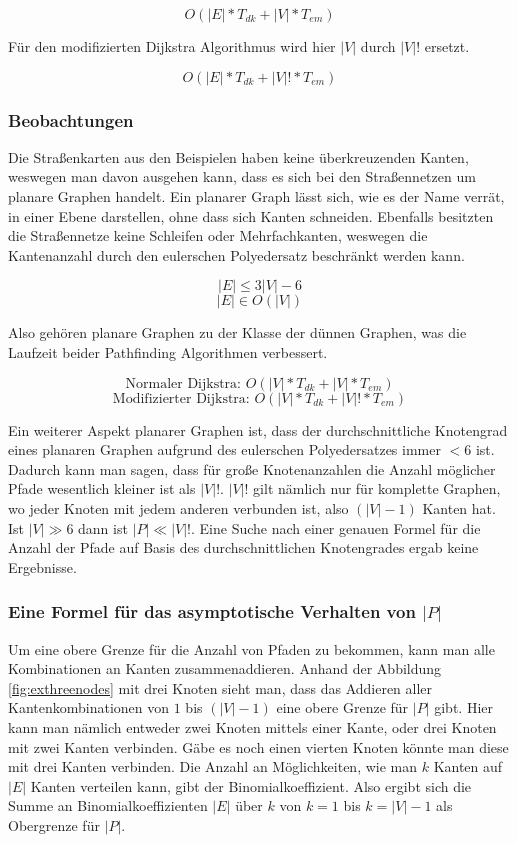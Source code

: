 \documentclass[a4paper,10pt,ngerman]{scrartcl}
\begin{document}
$$
O(|E| * T_{dk} + |V| * T_{em})
$$

Für den modifizierten Dijkstra Algorithmus wird hier $|V|$ durch $|V|!$ ersetzt.

$$
O(|E| * T_{dk} + |V|! * T_{em})
$$

\subsubsection{Beobachtungen}
Die Straßenkarten aus den Beispielen haben keine überkreuzenden Kanten, weswegen man davon ausgehen kann, dass es sich bei den Straßennetzen um planare Graphen handelt.
Ein planarer Graph lässt sich, wie es der Name verrät, in einer Ebene darstellen, ohne dass sich Kanten schneiden. Ebenfalls besitzten die Straßennetze keine Schleifen oder
Mehrfachkanten, weswegen die Kantenanzahl durch den eulerschen Polyedersatz beschränkt werden kann.

$$ |E| \leq 3|V| - 6 $$
$$ |E| \in O(|V|) $$

Also gehören planare Graphen zu der Klasse der dünnen Graphen, was die Laufzeit beider Pathfinding Algorithmen verbessert.

$$ \text{Normaler Dijkstra: } O(|V| * T_{dk} + |V| * T_{em}) $$
$$ \text{Modifizierter Dijkstra: } O(|V| * T_{dk} + |V|! * T_{em}) $$

Ein weiterer Aspekt planarer Graphen ist, dass der durchschnittliche Knotengrad eines planaren Graphen aufgrund des eulerschen Polyedersatzes immer $< 6$ ist.
Dadurch kann man sagen, dass für große Knotenanzahlen die Anzahl möglicher Pfade wesentlich kleiner ist als $|V|!$.
$|V|!$ gilt nämlich nur für komplette Graphen, wo jeder Knoten mit jedem anderen verbunden ist, also $(|V| - 1)$ Kanten hat.
Ist $|V| \gg 6$ dann ist $|P| \ll |V|!$. Eine Suche nach einer genauen Formel für die Anzahl der Pfade auf Basis des durchschnittlichen Knotengrades ergab keine Ergebnisse.

\subsubsection{Eine Formel für das asymptotische Verhalten von $|P|$}
Um eine obere Grenze für die Anzahl von Pfaden zu bekommen, kann man alle Kombinationen an Kanten zusammenaddieren.
Anhand der Abbildung \ref{fig:exthreenodes} mit drei Knoten sieht man, dass das Addieren aller Kantenkombinationen von $1$ bis $(|V| - 1)$ eine obere Grenze für $|P|$ gibt.
Hier kann man nämlich entweder zwei Knoten mittels einer Kante, oder drei Knoten mit zwei Kanten verbinden.
Gäbe es noch einen vierten Knoten könnte man diese mit drei Kanten verbinden.
Die Anzahl an Möglichkeiten, wie man $k$ Kanten auf $|E|$ Kanten verteilen kann, gibt der Binomialkoeffizient.
Also ergibt sich die Summe an Binomialkoeffizienten $|E|$ über $k$ von $k=1$ bis $k=|V|-1$ als Obergrenze für $|P|$.
\end{document}

